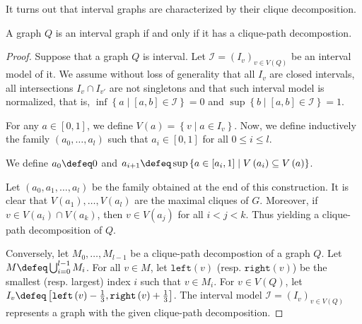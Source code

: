 \documentclass{article}
\begin{document}
    It turns out that interval
    graphs are characterized by
    their clique decomposition.
    
    \begin{prop} \label{clique-path}
        A graph $Q$ is an 
        interval graph if and only if
        it has a clique-path decompostion.
    \end{prop}
    \begin{proof}
        Suppose that a graph $Q$ 
        is interval.
        Let $\mathcal{I} = \left(I_{v}\right)_{v \in V\left(Q\right)}$ 
        be an interval model of it.
        We assume without loss
        of generality that
        all $I_{v}$ are closed
        intervals, all intersections
        $I_{v} \cap I_{v'}$ are
        not singletons and that
        such interval model is
        normalized, that is,
        $\inf \left\{a \mid \left[a, b\right] \in \mathcal{I} \right\} = 0$
        and $\sup \left\{b \mid \left[a, b\right] \in \mathcal{I}\right\} = 1$.

        For any $a \in \left[0, 1\right]$, 
        we define $V\left(a\right) = \left\{v \mid a \in I_{v}\right\}$.
        Now, we define inductively the
        family $\left(a_0, \ldots, a_{l}\right)$ 
        such that $a_i \in \left[0, 1\right]$ 
        for all $0 \leq i \leq l$.

        We define $a_0 \defeq 0$ and
        $a_{i+1} \defeq \sup \left\{a \in \left[a_{i}, 1\right] \mid 
        V\left(a_{i}\right) \subseteq V\left(a\right)\right\}$.
        
        Let $\left(a_0, a_1, \ldots, a_{l}\right)$ 
        be the family obtained at 
        the end of this construction.
        It is clear that $V\left(a_1\right), \ldots, V\left(a_{l}\right)$ 
        are the maximal cliques of $G$.
        Moreover, if $v \in V\left(a_{i}\right) \cap V\left(a_{k}\right)$,
        then $v \in V\left(a_{j}\right)$
        for all $i < j < k$.
        Thus yielding a clique-path 
        decomposition of $Q$.

        Conversely, let $M_0, \ldots, M_{l-1}$ 
        be a clique-path decompostion
        of a graph $Q$. 
        Let $M \defeq \bigcup_{i=0}^{l-1} M_{i}$.
        For all $v \in M$,
        let $\texttt{left}\left(v\right)$
        (resp. $\texttt{right}\left(v\right)$)
        be the smallest
        (resp. largest) index $i$ 
        such that $v \in M_{i}$.
        For $v \in V\left(Q\right)$,
        let $I_{v} \defeq \left[\texttt{left}\left(v\right) - \frac{1}{3}, 
        \texttt{right}\left(v\right) + \frac{1}{3}\right]$.
        The interval model $\mathcal{I} = \left(I_{v}\right)_{v \in V\left(Q\right)}$
        represents a graph with the
        given clique-path decomposition.
    \end{proof}
\end{document}
